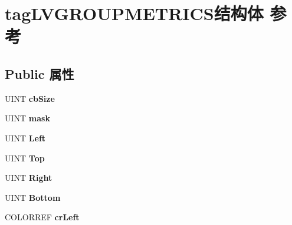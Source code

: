 \hypertarget{structtag_l_v_g_r_o_u_p_m_e_t_r_i_c_s}{}\section{tag\+L\+V\+G\+R\+O\+U\+P\+M\+E\+T\+R\+I\+C\+S结构体 参考}
\label{structtag_l_v_g_r_o_u_p_m_e_t_r_i_c_s}
\subsection*{Public 属性}
\begin{DoxyCompactItemize}
\item 
\mbox{\label{structtag_l_v_g_r_o_u_p_m_e_t_r_i_c_s_a1b0df1dc64f372dce5b8e136a1d27168}} 
U\+I\+NT {\bfseries cb\+Size}
\item 
\mbox{\label{structtag_l_v_g_r_o_u_p_m_e_t_r_i_c_s_ae71479b9fa2fcf82bd19e8869a28fa6f}} 
U\+I\+NT {\bfseries mask}
\item 
\mbox{\label{structtag_l_v_g_r_o_u_p_m_e_t_r_i_c_s_a2cfe9b60ae9e844e7b596e4587bb869b}} 
U\+I\+NT {\bfseries Left}
\item 
\mbox{\label{structtag_l_v_g_r_o_u_p_m_e_t_r_i_c_s_aa573372c2405bff9c6b7e869fff37be7}} 
U\+I\+NT {\bfseries Top}
\item 
\mbox{\label{structtag_l_v_g_r_o_u_p_m_e_t_r_i_c_s_a0782d701073f2eb67558197382cd0025}} 
U\+I\+NT {\bfseries Right}
\item 
\mbox{\label{structtag_l_v_g_r_o_u_p_m_e_t_r_i_c_s_af0be018fb2df7990b099f22e000b3c5c}} 
U\+I\+NT {\bfseries Bottom}
\item 
\mbox{\label{structtag_l_v_g_r_o_u_p_m_e_t_r_i_c_s_ac401e600dfa8563d72ba28981c03c664}} 
C\+O\+L\+O\+R\+R\+EF {\bfseries cr\+Left}
\item 
\mbox{\label{structtag_l_v_g_r_o_u_p_m_e_t_r_i_c_s_a581a184f76f67f5ab85cc6f00e08ddfc}} 

\end{DoxyCompactItemize}
